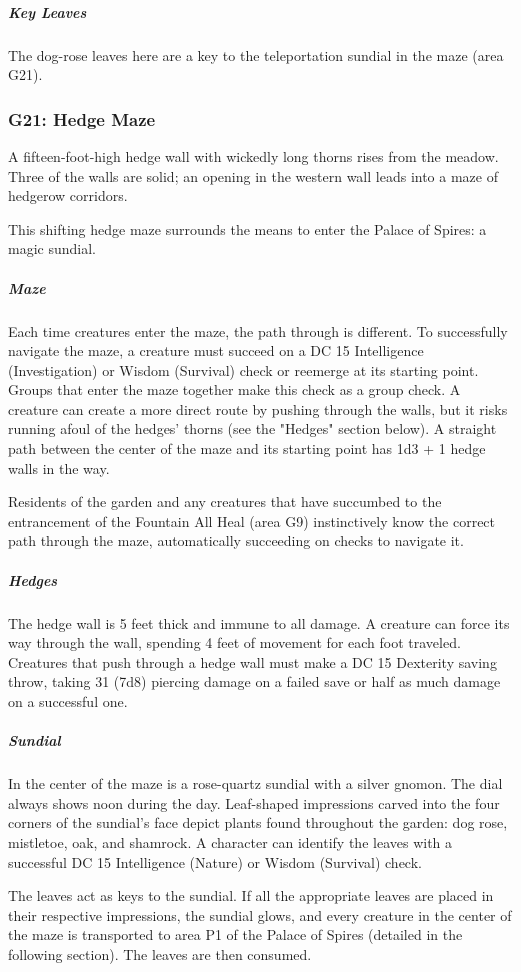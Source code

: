 \documentclass[10pt,a4paper,twoside,bg=print,twocolumn,openany,nodeprecatedcode]{dndbook}
\begin{document}
\subparagraph{Key Leaves}
The dog-rose leaves here are a key to the teleportation sundial in the maze (area G21).

\subsubsection{G21: Hedge Maze}
\begin{DndReadAloud}{}
A fifteen-foot-high hedge wall with wickedly long thorns rises from the meadow. Three of the walls are solid; an opening in the western wall leads into a maze of hedgerow corridors.

\end{DndReadAloud}

This shifting hedge maze surrounds the means to enter the Palace of Spires: a magic sundial.

\subparagraph{Maze}
Each time creatures enter the maze, the path through is different. To successfully navigate the maze, a creature must succeed on a DC 15 Intelligence (Investigation) or Wisdom (Survival) check or reemerge at its starting point. Groups that enter the maze together make this check as a group check. A creature can create a more direct route by pushing through the walls, but it risks running afoul of the hedges' thorns (see the "Hedges" section below). A straight path between the center of the maze and its starting point has 1d3 + 1 hedge walls in the way.

Residents of the garden and any creatures that have succumbed to the entrancement of the Fountain All Heal (area G9) instinctively know the correct path through the maze, automatically succeeding on checks to navigate it.

\subparagraph{Hedges}
The hedge wall is 5 feet thick and immune to all damage. A creature can force its way through the wall, spending 4 feet of movement for each foot traveled. Creatures that push through a hedge wall must make a DC 15 Dexterity saving throw, taking 31 (7d8) piercing damage on a failed save or half as much damage on a successful one.

\subparagraph{Sundial}
In the center of the maze is a rose-quartz sundial with a silver gnomon. The dial always shows noon during the day. Leaf-shaped impressions carved into the four corners of the sundial's face depict plants found throughout the garden: dog rose, mistletoe, oak, and shamrock. A character can identify the leaves with a successful DC 15 Intelligence (Nature) or Wisdom (Survival) check.

The leaves act as keys to the sundial. If all the appropriate leaves are placed in their respective impressions, the sundial glows, and every creature in the center of the maze is transported to area P1 of the Palace of Spires (detailed in the following section). The leaves are then consumed.
\end{document}
